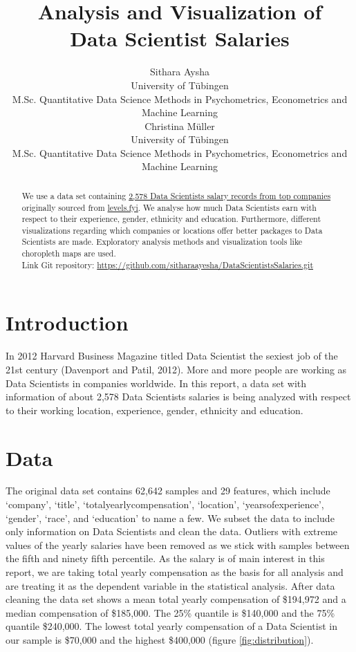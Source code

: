\documentclass{article}
\title{Analysis and Visualization of\\ Data Scientist Salaries}
\author{%
  Sithara Aysha\\
  University of Tübingen\\ 
  M.Sc. Quantitative Data Science Methods in Psychometrics, Econometrics and Machine Learning\\
  \And
  Christina Müller\\
   University of Tübingen\\
   M.Sc. Quantitative Data Science Methods in Psychometrics, Econometrics and Machine Learning \\
}
\begin{document}
\maketitle

\begin{abstract}
    We use a data set containing \href{https://www.kaggle.com/jackogozaly/data-science-and-stem-salaries}{2,578 Data Scientists salary records from top companies} originally sourced from \href{https://www.levels.fyi}{levels.fyi}. We analyse how much Data Scientists earn with respect to their experience, gender, ethnicity and education. Furthermore, different visualizations regarding which companies or locations offer better packages to Data Scientists are made. Exploratory analysis methods and visualization tools like choropleth maps are used. \\
    Link Git repository: \href{https://github.com/sitharaayesha/DataScientistsSalaries.git}{https://github.com/sitharaayesha/DataScientistsSalaries.git}
\end{abstract}

\section{Introduction}

In 2012 Harvard Business Magazine titled Data Scientist the sexiest job of the 21st century (Davenport and Patil, 2012). More and more people are working as Data Scientists in companies worldwide. In this report, a data set with information of about 2,578 Data Scientists salaries is being analyzed with respect to their working location, experience, gender, ethnicity and education.

\section{Data}
The original data set contains 62,642 samples and 29 features, which include ‘company', ‘title', ‘totalyearlycompensation', ‘location', ‘yearsofexperience', ‘gender', ‘race', and ‘education' to name a few. We subset the data to include only information on Data Scientists and clean the data. 
Outliers with extreme values of the yearly salaries have been removed as we stick with samples between the fifth and ninety fifth percentile. As the salary is of main interest in this report, we are taking total yearly compensation as the basis for all analysis and are treating it as the dependent variable in the statistical analysis. After data cleaning the data set shows a mean total yearly compensation of \$194,972 and a median compensation of \$185,000. The 25\% quantile is \$140,000 and the 75\% quantile \$240,000. The lowest total yearly compensation of a Data Scientist in our sample is \$70,000 and the highest \$400,000 (figure \ref{fig:distribution}).
\end{document}
